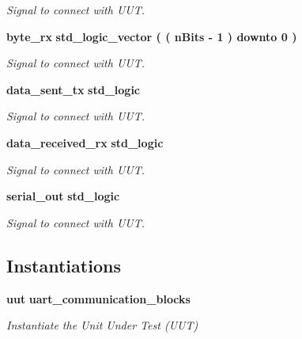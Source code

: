 \begin{DoxyCompactItemize}
\begin{DoxyCompactList}\small\item\em Signal to connect with U\-U\-T. \end{DoxyCompactList}\item 
{\bf byte\-\_\-rx} {\bfseries std\-\_\-logic\-\_\-vector (  ( n\-Bits -\/   1  )    downto    0  ) } \label{classtest_uart__communication__block_1_1behavior_a1e6d0e7b0a499eb191f1739ac27a3ee9}

\begin{DoxyCompactList}\small\item\em Signal to connect with U\-U\-T. \end{DoxyCompactList}\item 
{\bf data\-\_\-sent\-\_\-tx} {\bfseries std\-\_\-logic } \label{classtest_uart__communication__block_1_1behavior_a8f1ff141670d1dee066d28d88e7c7332}

\begin{DoxyCompactList}\small\item\em Signal to connect with U\-U\-T. \end{DoxyCompactList}\item 
{\bf data\-\_\-received\-\_\-rx} {\bfseries std\-\_\-logic } \label{classtest_uart__communication__block_1_1behavior_a0754d26733fa0f39b326e8baddca869a}

\begin{DoxyCompactList}\small\item\em Signal to connect with U\-U\-T. \end{DoxyCompactList}\item 
{\bf serial\-\_\-out} {\bfseries std\-\_\-logic } \label{classtest_uart__communication__block_1_1behavior_af282f34f154c9704a0f28c8f5a95123b}

\begin{DoxyCompactList}\small\item\em Signal to connect with U\-U\-T. \end{DoxyCompactList}\end{DoxyCompactItemize}
\subsection*{Instantiations}
 \begin{DoxyCompactItemize}
\item 
{\bf uut}  {\bfseries uart\-\_\-communication\-\_\-blocks}   \label{classtest_uart__communication__block_1_1behavior_a1619316ad715601eb5d3559db829ac05}

\begin{DoxyCompactList}\small\item\em Instantiate the Unit Under Test (U\-U\-T) \end{DoxyCompactList}\end{DoxyCompactItemize}


